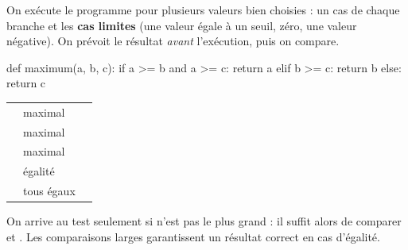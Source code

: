 \begin{savoirfaire}
On exécute le programme pour plusieurs valeurs bien choisies : un cas de chaque branche et les \textbf{cas limites} (une valeur égale
à un seuil, zéro, une valeur négative). On prévoit le résultat \emph{avant} l'exécution, puis on compare.
\end{savoirfaire}

\begin{exemple}
\begin{codecote}[0.42]
\begin{pythoncol}
def maximum(a, b, c):
    if a >= b and a >= c:
        return a
    elif b >= c:
        return b
    else:
        return c
\end{pythoncol}
\cote
{\renewcommand{\arraystretch}{1.25}%
\begin{tabularx}{\linewidth}{@{}lYl@{}}
\toprule
{} &  &  \\
\midrule
{} &  maximal &  \\
 &  maximal &  \\
 &  maximal &  \\
 & égalité &  \\
 & tous égaux &  \\
\bottomrule
\end{tabularx}}
\end{codecote}
On arrive au test  seulement si  n'est pas le plus grand : il suffit alors de comparer  et . Les
comparaisons larges \code{>=} garantissent un résultat correct en cas d'égalité.
\end{exemple}

